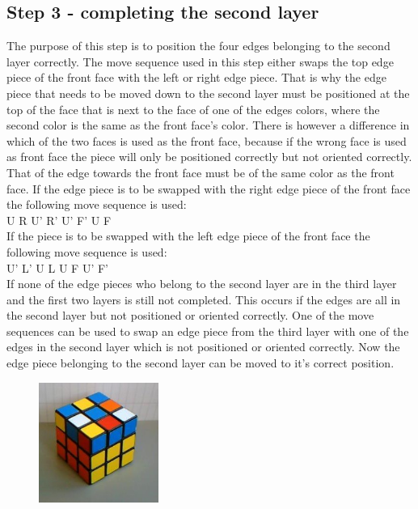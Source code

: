 \subsection{Step 3 - completing the second layer}
The purpose of this step is to position the four edges belonging to the second layer correctly. The move sequence used in this step either swaps the top edge piece of the front face with the left or right edge piece. That is why the edge piece that needs to be moved down to the second layer must be positioned at the top of the face that is next to the face of one of the edges colors, where the second color is the same as the front face's color. There is however a difference in which of the two faces is used as the front face, because if the wrong face is used as front face the piece will only be positioned correctly but not oriented correctly. That \facelet{} of the edge towards the front face must be of the same color as the front face. If the edge piece is to be swapped with the right edge piece of the front face the following move sequence is used: \\

U R U' R' U' F' U F \\

If the piece is to be swapped with the left edge piece of the front face the following move sequence is used: \\

U' L' U L U F U' F' \\

If none of the edge pieces who belong to the second layer are in the third layer and the first two layers is still not completed. This occurs if the edges are all in the second layer but not positioned or oriented correctly. One of the move sequences can be used to swap an edge piece from the third layer with one of the edges in the second layer which is not positioned or oriented correctly. Now the edge piece belonging to the second layer can be moved to it's correct position.

\begin{figure}
\begin{center}
	\includegraphics[width=0.35\textwidth]{input/pics/3F2L.jpg}	
\end{center}
\caption{}
\label{fig:3F2L}
\end{figure}

